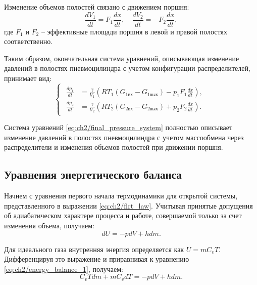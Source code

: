 Изменение объемов полостей связано с движением поршня:
\begin{equation}\label{eq:ch2/volume_change}
    \frac{dV_1}{dt} = F_1\frac{dx}{dt}, \quad \frac{dV_2}{dt} = -F_2\frac{dx}{dt},
\end{equation}
где $F_1$ и $F_2$ -- эффективные площади поршня в левой и правой полостях соответственно.

Таким образом, окончательная система уравнений, описывающая изменение
давлений в полостях пневмоцилиндра с учетом конфигурации распределителей, принимает вид:
\begin{equation}\label{eq:ch2/final_pressure_system}
    \begin{cases}
        \begin{aligned}
            \frac{dp_1}{dt} & = \frac{\gamma}{V_1}\left(RT_1(G_{1\text{вх}} - G_{1\text{вых}}) - p_1 F_1\frac{dx}{dt}\right), \\
            \frac{dp_2}{dt} & = \frac{\gamma}{V_2}\left(RT_2(G_{2\text{вх}} - G_{2\text{вых}}) + p_2 F_2\frac{dx}{dt}\right).
        \end{aligned}
    \end{cases}
\end{equation}

Система уравнений \eqref{eq:ch2/final_pressure_system} полностью описывает
изменение давлений в полостях пневмоцилиндра с учетом массообмена через
распределители и изменения объемов полостей при движении поршня.

\subsection{Уравнения энергетического баланса}\label{sec:ch2/sec2/subsec3}

Начнем с уравнения первого начала термодинамики для открытой системы, представленного в выражении \eqref{eq:ch2/firt_law}. Учитывая принятые допущения об адиабатическом характере процесса и работе, совершаемой только за счет изменения объема, получаем:
\begin{equation}\label{eq:ch2/energy_balance_1}
    dU = -pdV + hdm.
\end{equation}

Для идеального газа внутренняя энергия определяется как $U = mC_vT$. Дифференцируя это выражение и приравнивая к уравнению \eqref{eq:ch2/energy_balance_1}, получаем:
\begin{equation}\label{eq:ch2/energy_balance_2}
    C_vTdm + mC_vdT = -pdV + hdm.
\end{equation}

